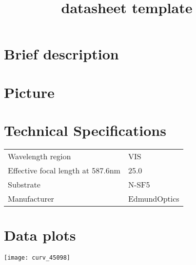 \documentclass{article}
\title{\vspace{-4cm}datasheet template}
\date{}
\begin{document}
\maketitle

\vspace{-1cm}

\begin{multicols}{2}

\section{Brief description}



\section{Picture}

\section{Technical Specifications}

\begin{tabular}{|l|l|}
Wavelength region & VIS \\
Effective focal length at 587.6nm & 25.0 \\
Substrate & N-SF5 \\
Manufacturer & EdmundOptics \\
\end{tabular}%

\section{Data plots} 

\begin{center}
\texttt{[image: curv\_45098]}
\end{center}



\end{multicols}
\end{document}
